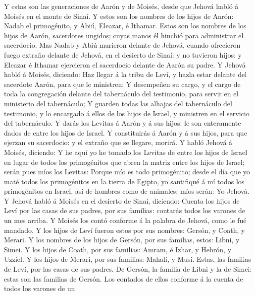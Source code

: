  Y estas son las generaciones de Aarón y de Moisés, desde
que Jehová habló á Moisés en el monte de Sinaí.  Y estos son
los nombres de los hijos de Aarón: Nadab el primogénito, y Abiú,
Eleazar, é Ithamar.  Estos son los nombres de los hijos de
Aarón, sacerdotes ungidos; cuyas manos él hinchió para administrar el
sacerdocio.  Mas Nadab y Abiú murieron delante de Jehová,
cuando ofrecieron fuego extraño delante de Jehová, en el desierto de
Sinaí: y no tuvieron hijos: y Eleazar é Ithamar ejercieron el sacerdocio
delante de Aarón su padre.  Y Jehová habló á Moisés,
diciendo:  Haz llegar á la tribu de Leví, y hazla estar
delante del sacerdote Aarón, para que le ministren;  Y
desempeñen su cargo, y el cargo de toda la congregación delante del
tabernáculo del testimonio, para servir en el ministerio del
tabernáculo;  Y guarden todas las alhajas del tabernáculo
del testimonio, y lo encargado á ellos de los hijos de Israel, y
ministren en el servicio del tabernáculo.  Y darás los
Levitas á Aarón y á sus hijos: le son enteramente dados de entre los
hijos de Israel.  Y constituirás á Aarón y á sus hijos,
para que ejerzan su sacerdocio: y el extraño que se llegare, morirá.
 Y habló Jehová á Moisés, diciendo:  Y he aquí
yo he tomado los Levitas de entre los hijos de Israel en lugar de todos
los primogénitos que abren la matriz entre los hijos de Israel; serán
pues míos los Levitas:  Porque mío es todo primogénito;
desde el día que yo maté todos los primogénitos en la tierra de Egipto,
yo santifiqué á mí todos los primogénitos en Israel, así de hombres como
de animales: míos serán: Yo Jehová.  Y Jehová habló á
Moisés en el desierto de Sinaí, diciendo:  Cuenta los hijos
de Leví por las casas de sus padres, por sus familias: contarás todos
los varones de un mes arriba.  Y Moisés los contó conforme
á la palabra de Jehová, como le fué mandado.  Y los hijos
de Leví fueron estos por sus nombres: Gersón, y Coath, y Merari.
 Y los nombres de los hijos de Gersón, por sus familias,
estos: Libni, y Simei.  Y los hijos de Coath, por sus
familias: Amram, é Izhar, y Hebrón, y Uzziel.  Y los hijos
de Merari, por sus familias: Mahali, y Musi. Estas, las familias de
Leví, por las casas de sus padres.  De Gersón, la familia
de Libni y la de Simei: estas son las familias de Gersón. 
Los contados de ellos conforme á la cuenta de todos los varones de un
